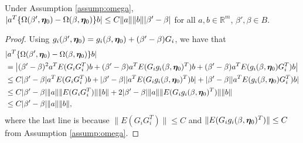 \documentclass[12pt]{article}
\begin{document}
{\begin{lemma} \label{lemma: Omega multiply}Under Assumption \ref{assump:omega}, 
	$|a^T \{\Omega(\beta', \bm \eta_0)-\Omega(\beta, \bm \eta_0)\}b| \leq C\|a\|\|b\||\beta'-\beta|  $ for all $a, b \in \mathbb{R}^m$, $\beta', \beta\in B$. 
\end{lemma}
\begin{proof}
	Using $ g_i(\beta', \bm \eta_0)= g_i(\beta,\bm \eta_0) + (\beta'- \beta)  G_i $, we have that 
	\begin{align*}
		&	|a^T \{\Omega(\beta', \bm \eta_0)-\Omega(\beta, \bm \eta_0)\}b|  \\
		&= \left|  (\beta'-\beta)^2 a^T E(G_iG_i^T) b + (\beta'-\beta) a^TE(G_ig_i(\beta, \bm \eta_0)^T) b +(\beta'-\beta) a^TE(g_i(\beta, \bm \eta_0) G_i^T) b  \right| \\
		&\leq C|\beta'-\beta| a^T E(G_iG_i^T) b  + |\beta'-\beta| | a^T E(G_ig_i(\beta, \bm \eta_0)^T) b | +  |\beta'-\beta| | a^TE(g_i(\beta, \bm \eta_0) G_i^T)  b | \\
		&\leq C|\beta'-\beta|  \|a\| \| E(G_iG_i^T) \| \|b\| +2 |\beta'-\beta| \| a\| \| E(G_ig_i(\beta, \bm \eta_0)^T) \| \| b \| \\
		&\leq C |\beta'-\beta|  \|a\| \|b\|,
	\end{align*}
	where 	the last line is because  $ \| E(G_iG_i^T) \| \leq C $ and $\| E(G_ig_i(\beta, \bm \eta_0)^T) \|\leq C $ from	  Assumption \ref{assump:omega}. 
\end{proof}



}
\end{document}
